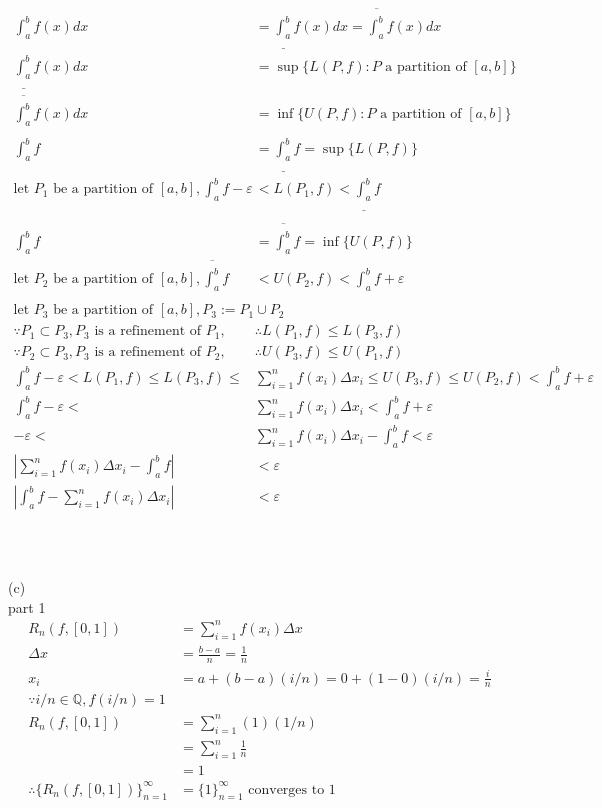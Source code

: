 \documentclass[12pt, border = 4pt, multi]{article} %
\begin{document}
\begin{align*}
\int_a ^ b f(x) dx &=  \underline{\int_a ^ b}f(x)dx = \overline{\int_a ^ b}f(x)dx\\
\underline{\int_a ^ b}f(x)dx &= \sup\{L(P, f): P \text{ a partition of }[a, b]\}\\
\overline{\int_a ^ b}f(x)dx &= \inf\{U(P, f): P \text{ a partition of }[a, b]\}\\
\\
\int_a ^ b f &= \underline{\int_a ^ b} f = \sup\{L(P, f)\}\\
\text{let } P_1 \text{ be a partition of }[a, b], \int_a ^ b f - \varepsilon &< L(P_1, f) < \underline{\int_a ^ b} f\\
\\
\int_a ^ b f &= \overline{\int_a ^ b} f = \inf\{U(P, f)\}\\
\text{let } P_2 \text{ be a partition of }[a, b], \overline{\int_a ^ b} f &< U(P_2, f) < \int_a ^ b f + \varepsilon\\
\\
\text{let } P_3 \text{ be a partition of }[a, b], P_3 := P_1 \cup P_2\\
\because P_1 \subset P_3, P_3 \text{ is a refinement of } P_1, &\therefore L(P_1, f) \leq L(P_3, f)\\
\because P_2 \subset P_3, P_3 \text{ is a refinement of } P_2, &\therefore U(P_3, f) \leq U(P_1, f)\\
\int_a ^ b f - \varepsilon < L(P_1, f) \leq L(P_3, f) \leq &\sum_{i = 1} ^ n f(x_i)\Delta x_i \leq U(P_3, f) \leq U(P_2, f) < \int_a ^ b f + \varepsilon\\
\int_a ^ b f - \varepsilon < &\sum_{i = 1} ^ n f(x_i)\Delta x_i < \int_a ^ b f + \varepsilon\\
- \varepsilon < &\sum_{i = 1} ^ n f(x_i)\Delta x_i - \int_a ^ b f < \varepsilon\\
\left|\sum_{i = 1} ^ n f(x_i)\Delta x_i - \int_a ^ b f\right| &< \varepsilon\\
\left|\int_a ^ b f - \sum_{i = 1} ^ n f(x_i)\Delta x_i\right| &< \varepsilon\\
\end{align*}
\\
\\
\\
(c)\\
part 1
\begin{align*}
R_n(f, [0, 1]) &= \sum_{i = 1} ^ n f(x_i) \Delta x\\
\Delta x &= \frac{b - a}{n} = \frac{1}{n}\\
x_i &= a + (b - a)(i / n) = 0 + (1 - 0)(i / n) = \frac{i}{n}\\
\because i / n \in \mathbb{Q}, f(i / n) = 1\\
R_n(f, [0, 1]) &= \sum_{i = 1} ^ n (1)(1 / n)\\
&= \sum_{i = 1} ^ n \frac{1}{n}\\
&= 1\\
\therefore \{R_n(f, [0, 1])\}_{n = 1} ^ {\infty} &= \{1\}_{n = 1} ^ {\infty} \text{ converges to 1}\\
\end{align*}
\end{document}
